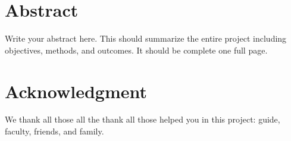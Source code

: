 \documentclass{academic-report}
\begin{document}
\maketitlepage

\makecertificate

\chapter*{Abstract}
\thispagestyle{empty}
Write your abstract here. This should summarize the entire project including objectives, methods, and outcomes. It should be complete one full page.
\clearpage

\makedeclaration

\chapter*{Acknowledgment}
\thispagestyle{empty}
We thank all those all the thank all those helped you in this project: guide, faculty, friends, and family.
\clearpage

\tableofcontents
\newpage
\listoffigures
\newpage
\listoftables
\clearpage

\setcounter{page}{1}









\clearpage
\printbibliography[heading=bibintoc, title={References}]
\makeappendices
\end{document}

